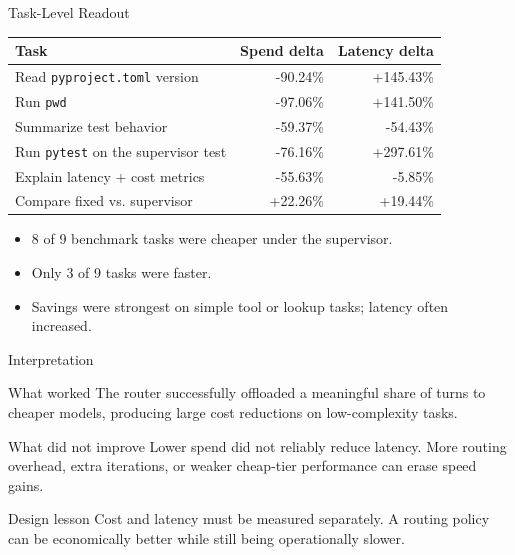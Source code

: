 \documentclass[aspectratio=169]{beamer}
\begin{document}
\begin{frame}{Task-Level Readout}
  \begin{table}
    \centering
    \small
    \begin{tabular}{>{\raggedright\arraybackslash}p{}rr}
      \toprule
      Task & Spend delta & Latency delta \\
      \midrule
      Read \texttt{pyproject.toml} version & -90.24\% & +145.43\% \\
      Run \texttt{pwd} & -97.06\% & +141.50\% \\
      Summarize test behavior & -59.37\% & -54.43\% \\
      Run \texttt{pytest} on the supervisor test & -76.16\% & +297.61\% \\
      Explain latency + cost metrics & -55.63\% & -5.85\% \\
      Compare fixed vs. supervisor & +22.26\% & +19.44\% \\
      \bottomrule
    \end{tabular}
  \end{table}

  \vspace{0.4em}

  \begin{itemize}
    \item 8 of 9 benchmark tasks were cheaper under the supervisor.
    \item Only 3 of 9 tasks were faster.
    \item Savings were strongest on simple tool or lookup tasks; latency often increased.
  \end{itemize}
\end{frame}

\begin{frame}{Interpretation}
  \begin{block}{What worked}
    The router successfully offloaded a meaningful share of turns to cheaper models, producing large cost reductions on low-complexity tasks.
  \end{block}

  \begin{block}{What did not improve}
    Lower spend did not reliably reduce latency. More routing overhead, extra iterations, or weaker cheap-tier performance can erase speed gains.
  \end{block}

  \begin{alertblock}{Design lesson}
    Cost and latency must be measured separately. A routing policy can be economically better while still being operationally slower.
  \end{alertblock}
\end{frame}
\end{document}
